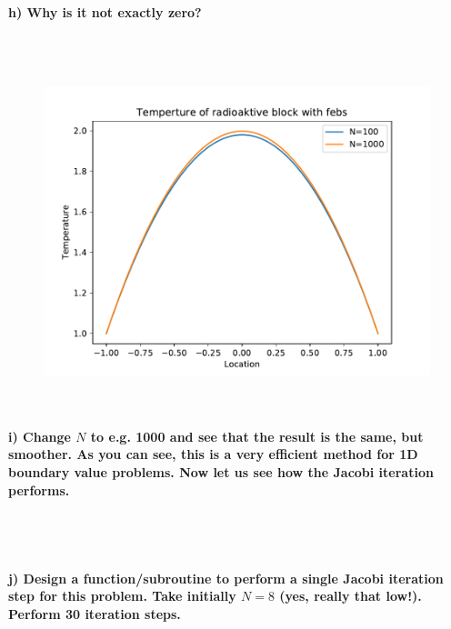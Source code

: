\paragraph{
    h) Why is it not exactly zero?
} \ \\
    \\
    \begin{figure}[h!]
        \centering
        \includegraphics[width=\textwidth]{../figures/Aufg1h.pdf}
    \end{figure} \ \\ 

\paragraph{
    i) Change $N$ to e.g. 1000 and see that the result is the same, but
    smoother. As you can see, this is a very efficient method for 1D
    boundary value problems. Now let us see how the Jacobi iteration
    performs.
} \ \\
    \\

\paragraph{
    j) Design a function/subroutine to perform a single Jacobi iteration
    step for this problem. Take initially $N=8$ (yes, really that low!).
    Perform 30 iteration steps.
} \ \\
    \\

